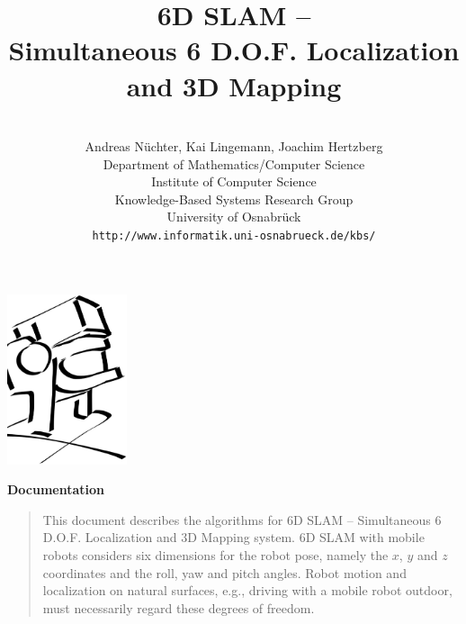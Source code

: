\documentclass[12pt,dvips]{article}
\begin{document}
{
\title{\vspace*{-5mm}
\bf 6D SLAM -- \\%
Simultaneous 6 D.O.F. Localization \\and 3D Mapping\\%
}
\author{
\\[3ex]  
Andreas N\"uchter, Kai Lingemann, Joachim Hertzberg\\ 
Department of Mathematics/Computer Science\\
Institute of Computer Science\\
Knowledge-Based Systems Research Group\\
University of Osnabr\"uck\\
{\small \texttt{http://www.informatik.uni-osnabrueck.de/kbs/}}
}

\maketitle
\thispagestyle{empty}

\vspace*{-12mm}

\begin{center}
\includegraphics[height=50mm]{stylish_scanner}
\end{center}

\vspace*{1mm}
  
\begin{center}
\textbf{Documentation}
\end{center}

\begin{quote}
This document describes the algorithms for 6D SLAM --
Simultaneous 6 D.O.F. Localization and 3D Mapping system. 6D SLAM
with mobile robots considers six dimensions for the robot pose,
namely the $x$, $y$ and $z$ coordinates and the roll, yaw and
pitch angles. Robot motion and localization on natural surfaces,
e.g., driving with a mobile robot outdoor, must necessarily
regard these degrees of freedom.
\end{quote}  

}
\end{document}
